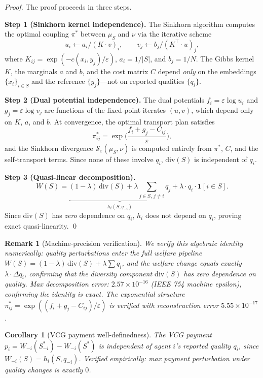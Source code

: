 \documentclass[10pt]{article}
\newtheorem{corollary}[theorem]{Corollary}
\newtheorem{remark}[theorem]{Remark}
\begin{document}
\begin{proof}
The proof proceeds in three steps.

\textbf{Step 1 (Sinkhorn kernel independence).}
The Sinkhorn algorithm computes the optimal coupling $\pi^*$ between $\mu_S$ and $\nu$ via the iterative scheme
\[
u_i \leftarrow a_i / (K \cdot v)_i, \qquad v_j \leftarrow b_j / (K^\top \cdot u)_j,
\]
where $K_{ij} = \exp(-c(x_i, y_j)/\varepsilon)$, $a_i = 1/|S|$, and $b_j = 1/N$.
The Gibbs kernel $K$, the marginals $a$ and $b$, and the cost matrix $C$ depend \emph{only} on the embeddings $\{x_i\}_{i \in S}$ and the reference $\{y_j\}$---not on reported qualities $\{q_i\}$.

\textbf{Step 2 (Dual potential independence).}
The dual potentials $f_i = \varepsilon \log u_i$ and $g_j = \varepsilon \log v_j$ are functions of the fixed-point iterates $(u, v)$, which depend only on $K$, $a$, and $b$.
At convergence, the optimal transport plan satisfies
\[
\pi^*_{ij} = \exp\!\Big(\frac{f_i + g_j - C_{ij}}{\varepsilon}\Big),
\]
and the Sinkhorn divergence $\mathcal{S}_\varepsilon(\mu_S, \nu)$ is computed entirely from $\pi^*$, $C$, and the self-transport terms.
Since none of these involve $q_i$, $\mathrm{div}(S)$ is independent of $q_i$.

\textbf{Step 3 (Quasi-linear decomposition).}
\[
W(S) = \underbrace{(1-\lambda)\,\mathrm{div}(S) + \lambda \sum_{j \in S,\, j \neq i} q_j}_{h_i(S, q_{-i})} + \lambda \cdot q_i \cdot \mathbf{1}[i \in S].
\]
Since $\mathrm{div}(S)$ has \emph{zero} dependence on $q_i$, $h_i$ does not depend on $q_i$, proving exact quasi-linearity. \qed
\end{proof}

\begin{remark}[Machine-precision verification]
We verify this algebraic identity numerically: quality perturbations enter the full welfare pipeline $W(S) = (1-\lambda)\,\mathrm{div}(S) + \lambda\sum q_i$, and the welfare change equals exactly $\lambda \cdot \Delta q_i$, confirming that the diversity component $\mathrm{div}(S)$ has zero dependence on quality.
Max decomposition error: $2.57 \times 10^{-16}$ (IEEE 754 machine epsilon), confirming the identity is exact.
The exponential structure $\pi^*_{ij} = \exp((f_i + g_j - C_{ij})/\varepsilon)$ is verified with reconstruction error $5.55 \times 10^{-17}$.
\end{remark}

\begin{corollary}[VCG payment well-definedness]
\label{cor:payment}
The VCG payment $p_i = W_{-i}(S^*_{-i}) - W_{-i}(S^*)$ is independent of agent $i$'s reported quality $q_i$, since $W_{-i}(S) = h_i(S, q_{-i})$.
Verified empirically: max payment perturbation under quality changes is exactly $0$.
\end{corollary}
\end{document}
